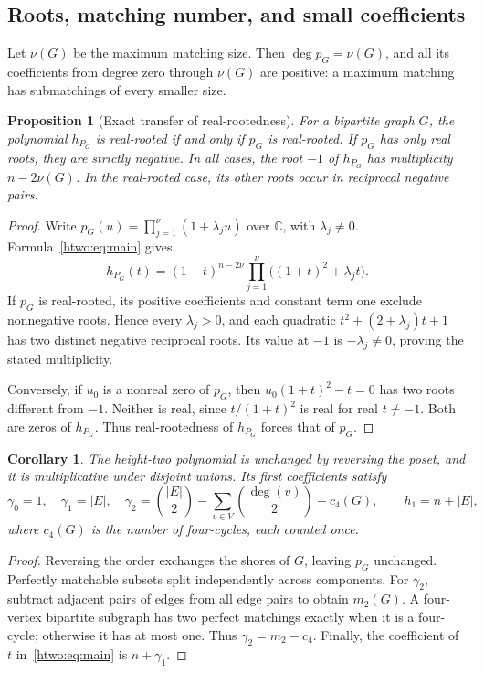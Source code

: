 \documentclass[11pt]{article}
\numberwithin{equation}{section}
\newtheorem{proposition}[theorem]{Proposition}
\newtheorem{corollary}[theorem]{Corollary}
\theoremstyle{definition}
\newcommand{\C}{\mathbb C}
\begin{document}
\subsection{Roots, matching number, and small coefficients}

Let $\nu(G)$ be the maximum matching size. Then $\deg p_G=\nu(G)$, and
all its coefficients from degree zero through $\nu(G)$ are positive:
a maximum matching has submatchings of every smaller size.

\begin{proposition}[Exact transfer of real-rootedness]\label{htwo:prop:roottransfer}
For a bipartite graph $G$, the polynomial $h_{P_G}$ is real-rooted if and
only if $p_G$ is real-rooted. If $p_G$ has only real roots, they are strictly
negative. In all cases, the root $-1$ of $h_{P_G}$ has multiplicity
$n-2\nu(G)$. In the real-rooted case, its other roots occur in reciprocal
negative pairs.
\end{proposition}
\begin{proof}
Write $p_G(u)=\prod_{j=1}^{\nu}(1+\lambda_j u)$ over $\C$, with
$\lambda_j\ne0$. Formula~\eqref{htwo:eq:main} gives
\begin{equation}
 h_{P_G}(t)=(1+t)^{n-2\nu}
          \prod_{j=1}^{\nu}\bigl((1+t)^2+\lambda_jt\bigr).
 \label{htwo:eq:factortransfer}
\end{equation}
If $p_G$ is real-rooted, its positive coefficients and constant term one
exclude nonnegative roots. Hence every $\lambda_j>0$, and each quadratic
$t^2+(2+\lambda_j)t+1$ has two distinct negative reciprocal roots.
Its value at $-1$ is $-\lambda_j\ne0$, proving the stated multiplicity.

Conversely, if $u_0$ is a nonreal zero of $p_G$, then
$u_0(1+t)^2-t=0$ has two roots different from $-1$. Neither is real, since
$t/(1+t)^2$ is real for real $t\ne-1$. Both are zeros of $h_{P_G}$.
Thus real-rootedness of $h_{P_G}$ forces that of $p_G$.
\end{proof}

\begin{corollary}\label{htwo:cor:small}
The height-two polynomial is unchanged by reversing the poset, and it is
multiplicative under disjoint unions. Its first coefficients satisfy
\[
 \gamma_0=1,\quad \gamma_1=|E|,\quad
 \gamma_2=\binom{|E|}{2}-\sum_{v\in V}\binom{\deg(v)}2-c_4(G),
 \qquad h_1=n+|E|,
\]
where $c_4(G)$ is the number of four-cycles, each counted once.
\end{corollary}
\begin{proof}
Reversing the order exchanges the shores of $G$, leaving $p_G$ unchanged.
Perfectly matchable subsets split independently across components. For
$\gamma_2$, subtract adjacent pairs of edges from all edge pairs to obtain
$m_2(G)$. A four-vertex bipartite subgraph has two perfect matchings exactly
when it is a four-cycle; otherwise it has at most one. Thus
$\gamma_2=m_2-c_4$. Finally, the coefficient of $t$ in~\eqref{htwo:eq:main} is
$n+\gamma_1$.
\end{proof}
\end{document}
